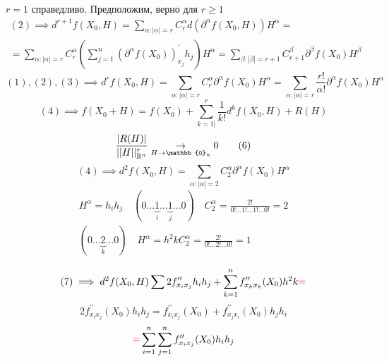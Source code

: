 \documentclass[main]{subfiles}
\begin{document}
        \begin{longProof}[по индукции]
            $r = 1$ справедливо. Предположим, верно для $r \geq 1$ 
            \begin{multline*}
                (2) \implies d^{r+1}f(X_0, H) = \sum_{\alpha: |\alpha| = r} C^\alpha_r d(\partial^\alpha f(X_0,H))H^\alpha = \\
                = \sum_{\alpha: |\alpha| = r} C^\alpha_r \left( \sum^n_{j=1} (\partial^\alpha f(X_0))^\prime_{x_j}h_j \right)H^\alpha = \sum_{\beta: |\beta|
                 = r+1} C_{r+1}^\beta \partial^\beta f(X_0) H^\beta 
            \end{multline*}
            \[ (1), (2), (3) \implies d^r f(X_0,H) = \sum_{\alpha: |\alpha| = r} C^\alpha_r \partial^\alpha f(X_0) H^\alpha =
             \sum_{\alpha: |\alpha|=r} \frac{r!}{\alpha!} \partial^\alpha f(X_0) H^\alpha \tag{4} \] 
            \[ (4) \implies f(X_0 + H) = f(X_0) + \sum^r_{k=1|} \frac{1}{k!} d^k f(X_0, H) + R(H) \tag{5} \]
            \[ \frac{|R(H)|}{||H||^r_{\vR^n}} \underset{H \to \mathbb{0}_n}{\rightarrow} 0 \tag{6} \]
            \[ (4) \implies d^2f(X_0, H) = \sum_{\alpha : |\alpha| = 2} C^\alpha_2 \partial^\alpha f(X_0)H^\alpha \tag{7} \] 
            \begin{gather*}
                H^\alpha = h_i h_j \quad (0 \ldots \underbrace{1}_i \ldots \underbrace{1}_j \ldots 0) \quad C^\alpha_2 = \frac{2!}{0! \ldots 1! \ldots 1! \ldots 0!} = 2 \\
                (0 \ldots \underbrace{2}_k \ldots 0) \quad H^\alpha = h^2k C^\alpha_2 = \frac{2!}{0! \ldots 2! \ldots 0!} = 1 \\
            \end{gather*}
               \[ (7) \implies d^2 f(X_0, H) \sum 2 f^{\prime\prime}_{x_ix_j} h_i h_j + \sum^n_{k=1}f^{\prime\prime}_{x_kx_k}(X_0)h^2 k \textcolor{red}{ =} \] 
               \[ 2f^{\prime\prime}_{x_ix_j}(X_0) h_ih_j = f^{\prime\prime}_{x_ix_j}(X_0) + f^{\prime\prime}_{x_jx_i}(X_0)h_j h_i \tag{8} \]
               \[ \textcolor{red}{ = } \sum^n_{i=1} \sum^n_{j=1} f^{\prime\prime}_{x_ix_j}(X_0) h_i h_j \]
        \end{longProof}
\end{document}
